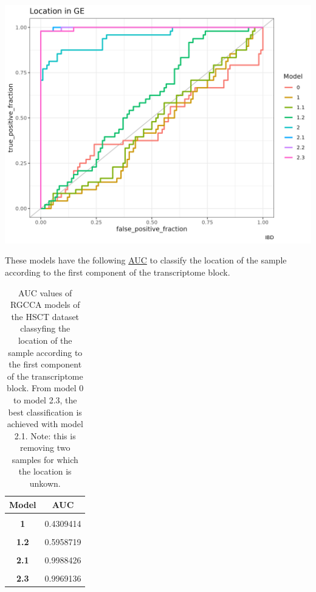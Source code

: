 \documentclass[
  12pt,
  a4paper,
  twoside,
  openright]{book}
\let\origfigure\figure
\let\endorigfigure\endfigure
\renewenvironment{figure}[1][2] {
    \expandafter\origfigure\expandafter[!htbp]
} {
    \endorigfigure
}
\begin{document}
\begin{figure}
\includegraphics[width=1\linewidth]{images/hsct-auc-models} \caption[AUC of the RGCCA models in the HSCT dataset.]{AUC of the RGCCA models in the HSCT dataset. The classification of the localization of the sample according to the first component of the gene expression of the models generated with RGCCA on the HSCT dataset. Models of family 2 classify much better the samples than models of family 1 or model 0.}\label{fig:hsct-auc-plot}
\end{figure}

These models have the following \protect\hyperlink{acronyms_AUC}{AUC} to classify the location of the sample according to the first component of the transcriptome block.

\begin{table}[H]

\caption[AUC values of RGCCA models in the HSCT dataset.]{\label{tab:hsct-auc}AUC values of RGCCA models of the HSCT dataset classyfing the location of the sample according to the first component of the transcriptome block. From model 0 to model 2.3, the best classification is achieved with model 2.1. Note: this is removing two samples for which the location is unkown.}
\centering
\begin{tabular}[t]{>{}c|c}
\hline
\textbf{Model} & \textbf{AUC}\\
\hline
\textbf{\cellcolor{gray!6}{0}} & \cellcolor{gray!6}{0.4537037}\\
\hline
\textbf{1} & 0.4309414\\
\hline
\textbf{\cellcolor{gray!6}{1.1}} & \cellcolor{gray!6}{0.4639275}\\
\hline
\textbf{1.2} & 0.5958719\\
\hline
\textbf{\cellcolor{gray!6}{2}} & \cellcolor{gray!6}{0.9450231}\\
\hline
\textbf{2.1} & 0.9988426\\
\hline
\textbf{\cellcolor{gray!6}{2.2}} & \cellcolor{gray!6}{0.9980710}\\
\hline
\textbf{2.3} & 0.9969136\\
\hline
\end{tabular}
\end{table}
\end{document}
